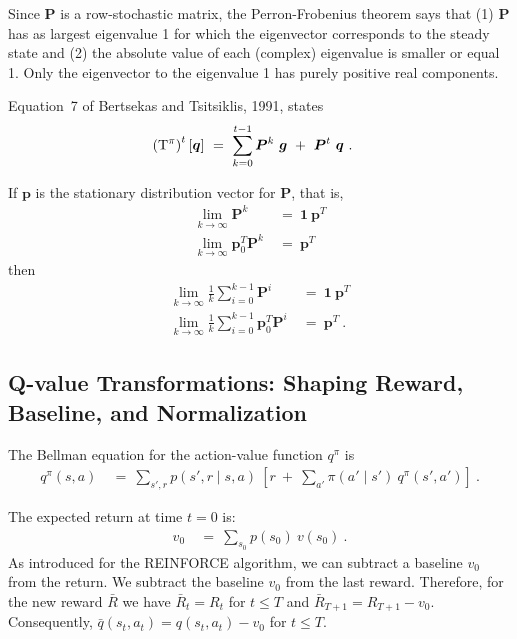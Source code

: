 \documentclass{article}
\newcommand\Bg{\bm{g}}
\newcommand\Bp{\bm{p}}
\newcommand\Bq{\bm{q}}
\newcommand\BP{\bm{P}}
\newcommand\BOn{\bm{1}}
\renewcommand{\leq}{\leqslant}
\begin{document}
\begin{appendices}
Since $\BP$ is a row-stochastic matrix, the
Perron-Frobenius theorem says that (1) $\BP$ has as largest eigenvalue 1 for which
the eigenvector corresponds to the steady state and
(2) the absolute value of each (complex) eigenvalue is smaller or equal 1.
Only the eigenvector to the eigenvalue 1 has purely positive real components.





Equation~7 of Bertsekas and Tsitsiklis, 1991, \cite{Bertsekas:91}
states
\begin{align}
  \label{eq:tfoldA}
  \left(\rT^\pi \right)^t \left[ \Bq \right]    \ &= \
  \sum_{k=0}^{t-1}  \BP^k \ \Bg
  \ + \  \BP^t \ \Bq  \ .
\end{align}

If $\Bp$ is the stationary distribution vector for $\BP$, that is,
\begin{align}
  \lim_{k \to \infty} \BP^k \ &= \ \BOn \ \Bp^T \\
  \lim_{k \to \infty} \Bp_0^T \BP^k \ &= \  \Bp^T 
\end{align}
then
\begin{align}
  \lim_{k \to \infty} \frac{1}{k} \sum_{i=0}^{k-1}  \BP^i \ &= \ \BOn
  \ \Bp^T \\
  \lim_{k \to \infty} \frac{1}{k} \sum_{i=0}^{k-1}  \Bp_0^T \BP^i \ &=
  \ \Bp^T \ .
\end{align}



\subsection{Q-value Transformations: Shaping Reward, Baseline, and Normalization}
\label{sec:qtransform}

The Bellman equation for the action-value function $q^\pi$ is
\begin{align}
  q^\pi(s,a) \ &= \ \sum_{s',r} p(s',r \mid s,a) \ \left[r \ + \ \sum_{a'} \pi(a' \mid s')
    \ q^\pi(s',a') \right] \ .
\end{align}

The expected return at time $t=0$ is:
\begin{align}
  v_0 \ &= \ \sum_{s_0} p(s_0) \ v(s_0)   \ .
\end{align}
As introduced for the REINFORCE algorithm,
we can subtract a baseline $v_0$ from the return.
We subtract the baseline $v_0$ from the last reward.
Therefore, for the new reward $\bar{R}$
we have $\bar{R}_t=R_t$ for $t \leq T$ and
$\bar{R}_{T+1} = R_{T+1} - v_0$.
Consequently, $\bar{q}(s_t,a_t)=q(s_t,a_t)-v_0$ for $t \leq T$.



\end{appendices}
\end{document}
